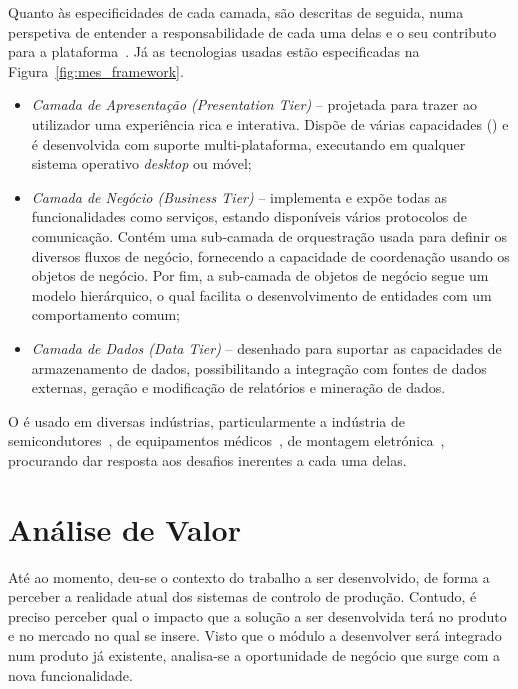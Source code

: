 Quanto às especificidades de cada camada, são descritas de seguida, numa perspetiva de entender a responsabilidade de cada uma delas e o seu contributo para a plataforma~\parencite{cmf_mes_framework}. Já as tecnologias usadas estão especificadas na Figura~\ref{fig:mes_framework}.

\begin{itemize}
    \item 
    {
        \textit{Camada de Apresentação (Presentation Tier)} -- projetada para trazer ao utilizador uma experiência rica e interativa. Dispõe de várias capacidades () e é desenvolvida com suporte multi-plataforma, executando em qualquer sistema operativo \textit{desktop} ou móvel;
    }
    \item
    {
        \textit{Camada de Negócio (Business Tier)} -- implementa e expõe todas as funcionalidades como serviços, estando disponíveis vários protocolos de comunicação. Contém uma sub-camada de orquestração usada para definir os diversos fluxos de negócio, fornecendo a capacidade de coordenação usando os objetos de negócio. Por fim, a sub-camada de objetos de negócio segue um modelo hierárquico, o qual facilita o desenvolvimento de entidades com um comportamento comum;
    }
    \item
    {
        \textit{Camada de Dados (Data Tier)} -- desenhado para suportar as capacidades de armazenamento de dados, possibilitando a integração com fontes de dados externas, geração e modificação de relatórios e mineração de dados.
    }
\end{itemize}

O {\productname} é usado em diversas indústrias, particularmente a indústria de semicondutores~\parencite{cmf_industries_semiconductor}, de equipamentos médicos~\parencite{cmf_industries_medical_devices}, de montagem eletrónica~\parencite{cmf_industries_electronics}, procurando dar resposta aos desafios inerentes a cada uma delas.

\section{Análise de Valor}
\label{sec:chap2_valueanalysis}

Até ao momento, deu-se o contexto do trabalho a ser desenvolvido, de forma a perceber a realidade atual dos sistemas de controlo de produção. Contudo, é preciso perceber qual o impacto que a solução a ser desenvolvida terá no produto e no mercado no qual se insere. Visto que o módulo a desenvolver será integrado num produto já existente, analisa-se a oportunidade de negócio que surge com a nova funcionalidade.

